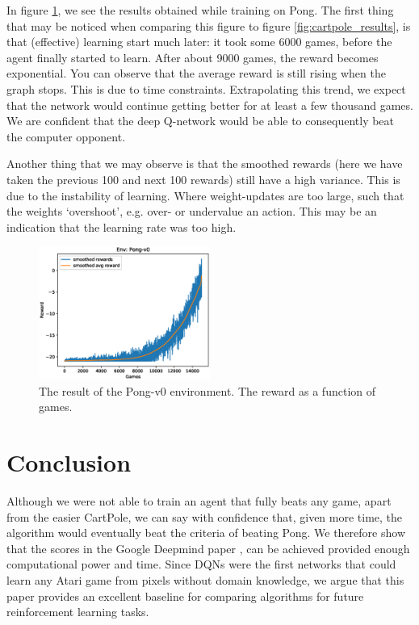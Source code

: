 \documentclass{article}
\begin{document}
In figure \ref{fig:pong_results}, we see the results obtained while training on Pong. The first thing that may be noticed when comparing this figure to figure \ref{fig:cartpole_results}, is that (effective) learning start much later: it took some 6000 games, before the agent finally started to learn. After about 9000 games, the reward becomes exponential. You can observe that the average reward is still rising when the graph stops. This is due to time constraints. Extrapolating this trend, we expect that the network would continue getting better for at least a few thousand games. We are confident that the deep Q-network would  be able to consequently beat the computer opponent.

Another thing that we may observe is that the smoothed rewards (here we have taken the previous 100 and next 100 rewards) still have a high variance. This is due to the instability of learning. Where weight-updates are too large, such that the weights `overshoot', e.g. over- or undervalue an action. This may be an indication that the learning rate was too high.

\begin{figure}[H]
\centering
\includegraphics[width=0.5\textwidth]{images/pong_results.eps}
\caption{The result of the Pong-v0 environment. The reward as a function of games.}
\label{fig:pong_results}
\end{figure}

\section{Conclusion}
Although we were not able to train an agent that fully beats any game, apart from the easier CartPole, we can say with confidence that, given more time, the algorithm would eventually beat the criteria of beating Pong. We therefore show that the scores in the Google Deepmind paper \cite{mnih2013playing}, can be achieved provided enough computational power and time. Since DQNs were the first networks that could learn any Atari game from pixels without domain knowledge, we argue that this paper provides an excellent baseline for comparing algorithms for future reinforcement learning tasks.
\end{document}
